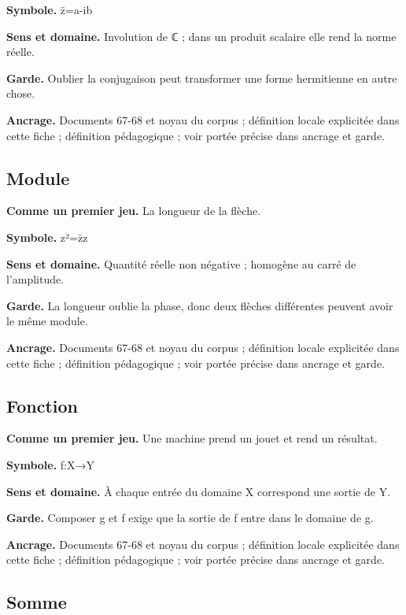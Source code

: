 \documentclass[
  9pt,
  a4paper,
]{article}
\begin{document}
\textbf{Symbole.} z̄=a-ib

\textbf{Sens et domaine.} Involution de ℂ ; dans un produit scalaire
elle rend la norme réelle.

\textbf{Garde.} Oublier la conjugaison peut transformer une forme
hermitienne en autre chose.

\textbf{Ancrage.} Documents 67-68 et noyau du corpus ; définition locale
explicitée dans cette fiche ; définition pédagogique ; voir portée
précise dans ancrage et garde.

\hypertarget{module}{%
\subsection{Module}\label{module}}

\textbf{Comme un premier jeu.} La longueur de la flèche.

\textbf{Symbole.} \textbar z\textbar²=z̄z

\textbf{Sens et domaine.} Quantité réelle non négative ; homogène au
carré de l'amplitude.

\textbf{Garde.} La longueur oublie la phase, donc deux flèches
différentes peuvent avoir le même module.

\textbf{Ancrage.} Documents 67-68 et noyau du corpus ; définition locale
explicitée dans cette fiche ; définition pédagogique ; voir portée
précise dans ancrage et garde.

\hypertarget{fonction}{%
\subsection{Fonction}\label{fonction}}

\textbf{Comme un premier jeu.} Une machine prend un jouet et rend un
résultat.

\textbf{Symbole.} f:X→Y

\textbf{Sens et domaine.} À chaque entrée du domaine X correspond une
sortie de Y.

\textbf{Garde.} Composer g et f exige que la sortie de f entre dans le
domaine de g.

\textbf{Ancrage.} Documents 67-68 et noyau du corpus ; définition locale
explicitée dans cette fiche ; définition pédagogique ; voir portée
précise dans ancrage et garde.

\hypertarget{somme}{%
\subsection{Somme}\label{somme}}
\end{document}

